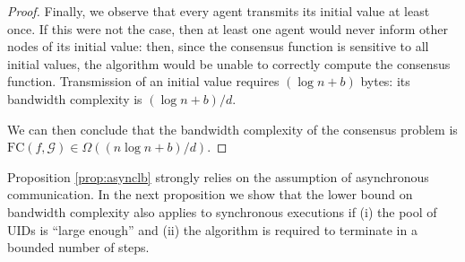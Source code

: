 \documentclass[letterpaper,10pt,conference]{ieeeconf}
\begin{document}
\begin{proof}
Finally, we observe that every agent transmits its initial value at least once. If this were not the case, then at least one agent would never inform other nodes of its initial value: then, since the consensus function is sensitive to all initial values, the algorithm would be unable to correctly compute the consensus function. Transmission of an initial value requires $(\log n+b)$ bytes: its bandwidth complexity is $(\log n + b)/d$.

We can then conclude that the bandwidth complexity of the consensus problem is $\textrm{FC}(f, \mathcal G) \in \Omega((n\log n +b)/d)$.
 \end{proof}
 
 Proposition \ref{prop:asynclb} strongly relies on the assumption of asynchronous communication. In the next proposition we show that the lower bound on bandwidth complexity also applies to synchronous executions if (i) the pool of UIDs is ``large enough'' and (ii) the algorithm is required to terminate in a bounded number of steps.
 
\end{document}
